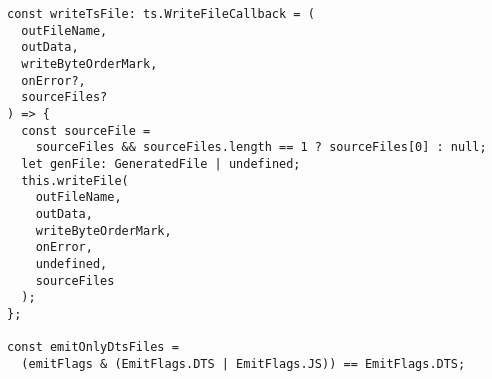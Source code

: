 \begin{verbatim}
const writeTsFile: ts.WriteFileCallback = (
  outFileName,
  outData,
  writeByteOrderMark,
  onError?,
  sourceFiles?
) => {
  const sourceFile =
    sourceFiles && sourceFiles.length == 1 ? sourceFiles[0] : null;
  let genFile: GeneratedFile | undefined;
  this.writeFile(
    outFileName,
    outData,
    writeByteOrderMark,
    onError,
    undefined,
    sourceFiles
  );
};

const emitOnlyDtsFiles =
  (emitFlags & (EmitFlags.DTS | EmitFlags.JS)) == EmitFlags.DTS;
\end{verbatim}
